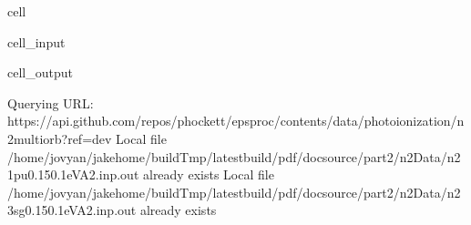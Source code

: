 \documentclass[letterpaper,table,10pt,english]{jupyterBook}
\begin{document}
\begin{sphinxuseclass}{cell}\begin{sphinxVerbatimInput}

\begin{sphinxuseclass}{cell_input}
\begin{sphinxVerbatim}[commandchars=\\\{\}]
  

   

    
                                                       
\end{sphinxVerbatim}

\end{sphinxuseclass}\end{sphinxVerbatimInput}
\begin{sphinxVerbatimOutput}

\begin{sphinxuseclass}{cell_output}
\begin{sphinxVerbatim}[commandchars=\\\{\}]
Querying URL: https://api.github.com/repos/phockett/epsproc/contents/data/photoionization/n2\PYGZus{}multiorb?ref=dev
Local file /home/jovyan/jake\PYGZhy{}home/buildTmp/\PYGZus{}latest\PYGZus{}build/pdf/doc\PYGZhy{}source/part2/n2Data/n2\PYGZus{}1pu\PYGZus{}0.1\PYGZhy{}50.1eV\PYGZus{}A2.inp.out already exists
Local file /home/jovyan/jake\PYGZhy{}home/buildTmp/\PYGZus{}latest\PYGZus{}build/pdf/doc\PYGZhy{}source/part2/n2Data/n2\PYGZus{}3sg\PYGZus{}0.1\PYGZhy{}50.1eV\PYGZus{}A2.inp.out already exists
\end{sphinxVerbatim}

\end{sphinxuseclass}\end{sphinxVerbatimOutput}

\end{sphinxuseclass}
\end{document}
